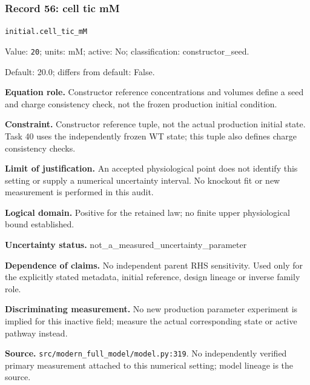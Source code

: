 \subsubsection*{Record 56: cell tic mM}
{\small \nolinkurl{initial.cell_tic_mM}\par

Value: \texttt{20}; units: mM; active: No; classification: constructor\_seed.\par

Default: 20.0; differs from default: False.\par

\textbf{Equation role.} Constructor reference concentrations and volumes define a seed and charge consistency check, not the frozen production initial condition.\par

\textbf{Constraint.} Constructor reference tuple, not the actual production initial state. Task 40 uses the independently frozen WT state; this tuple also defines charge consistency checks.\par

\textbf{Limit of justification.} An accepted physiological point does not identify this setting or supply a numerical uncertainty interval. No knockout fit or new measurement is performed in this audit.\par

\textbf{Logical domain.} Positive for the retained law; no finite upper physiological bound established.\par

\textbf{Uncertainty status.} not\_a\_measured\_uncertainty\_parameter\par

\textbf{Dependence of claims.} No independent parent RHS sensitivity. Used only for the explicitly stated metadata, initial reference, design lineage or inverse family role.\par

\textbf{Discriminating measurement.} No new production parameter experiment is implied for this inactive field; measure the actual corresponding state or active pathway instead.\par

\textbf{Source.} \nolinkurl{src/modern_full_model/model.py:319}. No independently verified primary measurement attached to this numerical setting; model lineage is the source.\par}

